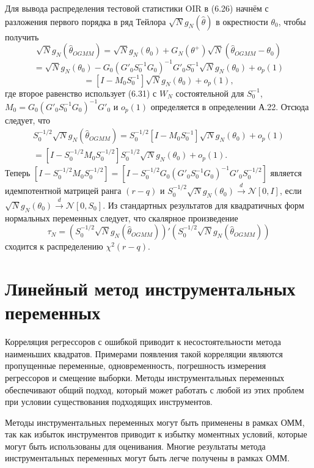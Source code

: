 Для вывода распределения тестовой статистики OIR в (6.26) начнём с разложения первого порядка в ряд Тейлора $\sqrt{N} g_N(\hat{\theta})$ в окрестности $\theta_0$, чтобы получить
\[
\sqrt{N} g_N(\hat{\theta}_{OGMM}) = \sqrt{N} g_N(\theta_0)+G_N(\theta^+) \sqrt{N} (\hat{\theta}_{OGMM}-\theta_0)
\]
\[
= \sqrt{N} g_N(\theta_0)-G_0(G'_0 S^{-1}_0 G_0)^{-1} G'_0 S^{-1}_0 \sqrt{N} g_N(\theta_0) +o_{p}(1)
\]
\[
=[I-M_0 S^{-1}_0] \sqrt{N} g_N(\theta_0) +o_{p}(1),
\]
где второе равенство использует (6.31) с  $W_N$ состоятельной для $S^{-1}_0$, $M_0=G_0(G'_0 S^{-1}_0 G_0)^{-1} G'_0$ и $o_{p}(1)$ определяется в определении А.22. Отсюда следует, что 
\begin{equation}
\begin{matrix}
S^{-1/2}_0 \sqrt{N} g_N(\hat{\theta}_{OGMM})= S^{-1/2}_0 [I-M_0 S^{-1}_0] \sqrt{N} g_N(\theta_0) + o_{p}(1) \\
= [I-S^{-1/2}_0 M_0 S^{-1/2}_0 ] S^{-1/2}_0  \sqrt{N} g_N(\theta_0) + o_{p}(1).
\end{matrix}
\end{equation}
Теперь $[I-S^{-1/2}_0 M_0 S^{-1/2}_0 ] = [I-S^{-1/2}_0  G_0 (G'_0 S^{-1}_0 G_0)^{-1} G'_0 S^{-1/2}_0]$ является идемпотентной матрицей ранга $(r-q)$ и $S^{-1/2}_0 \sqrt{N} g_N(\theta_0) \xrightarrow{d} \mathcal{N} [0,I]$, если $\sqrt{N} g_N(\theta_0) \xrightarrow{d} \mathcal{N} [0,S_0]$. Из стандартных результатов для квадратичных форм нормальных переменных следует, что скалярное произведение
\[
\tau_N = (S^{-1/2}_0 \sqrt{N} g_N(\hat{\theta}_{OGMM}))'(S^{-1/2}_0 \sqrt{N} g_N(\hat{\theta}_{OGMM}))
\]
сходится к распределению $\chi^2(r-q)$.

\section{Линейный метод инструментальных переменных}

Корреляция регрессоров с ошибкой приводит к несостоятельности метода наименьших квадратов. Примерами появления такой корреляции являются пропущенные переменные, одновременность, погрешность измерения регрессоров и смещение выборки. Методы инструментальных переменных обеспечивают общий подход, который может работать с любой из этих проблем при условии существования подходящих инструментов.

Методы инструментальных переменных могут быть применены в рамках ОММ, так как избыток инструментов приводит к избытку моментных условий, которые могут быть использованы для оценивания. Многие результаты метода инструментальных переменных могут быть легче получены в рамках ОММ.

